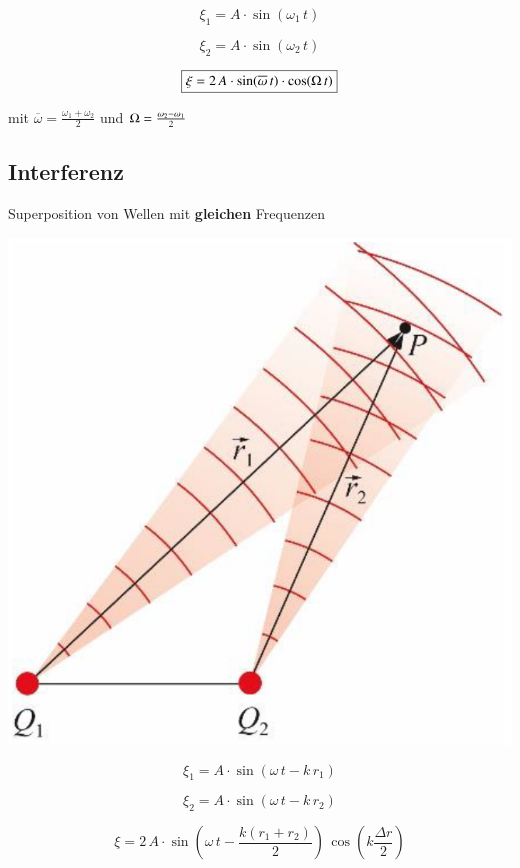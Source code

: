 \begin{minipage}{0.48\linewidth}
$$ \xi_1 = A \cdot \sin(\omega_1 \, t) $$
\end{minipage}
\hfill
\begin{minipage}{0.48\linewidth}
$$ \xi_2 = A \cdot \sin(\omega_2 \, t) $$
\end{minipage}

$$ \boxed{ \xi = 2 \, A \cdot \sin( \overline{\omega} \, t) \cdot \cos( \mathrm{\Omega} \, t) }$$

mit $\overline{\omega} = \frac{\omega_1 + \omega_2}{2}$ und  $\mathrm{\Omega} = \frac{\omega_2 - \omega_1}{2}$



\subsection{Interferenz}

Superposition von Wellen mit \textbf{gleichen} Frequenzen \\
\vspace{0.2cm}

\begin{minipage}{0.4\linewidth}
\includegraphics[width=0.7\linewidth]{Bilder/Wellen-Optik/interferenz} \\
\end{minipage}
\hfill
\begin{minipage}{0.55\linewidth}
$$ \xi_1 = A \cdot \sin(\omega \, t - k \, r_1) $$

$$ \xi_2 = A \cdot \sin(\omega \, t - k \, r_2) $$

$$ \boxed{ \xi = 2 \, A \cdot \sin \left( \omega \, t - \frac{k (r_1 + r_2)}{2} \right) \,  \cos \left( k \frac{\Delta r}{2}  \right) } $$
\end{minipage}



